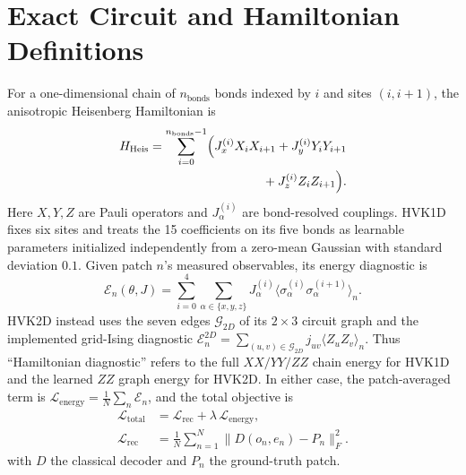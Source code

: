 \documentclass[11pt]{article}
\begin{document}
\section{Exact Circuit and Hamiltonian Definitions}
\label{sec:supp_exact_circuits}
For a one-dimensional chain of $n_{\text{bonds}}$ bonds indexed by $i$ and sites $(i,i+1)$, the anisotropic Heisenberg Hamiltonian is
\begin{align}
H_{\text{Heis}}=\sum_{i=0}^{n_{\text{bonds}}-1}\Bigl(
J_x^{(i)}X_iX_{i+1}+J_y^{(i)}Y_iY_{i+1}\nonumber\\
{}+J_z^{(i)}Z_iZ_{i+1}\Bigr).
\end{align}
Here $X,Y,Z$ are Pauli operators and $J_\alpha^{(i)}$ are bond-resolved couplings. HVK1D fixes six sites and treats the 15 coefficients on its five bonds as learnable parameters initialized independently from a zero-mean Gaussian with standard deviation $0.1$. Given patch $n$'s measured observables, its energy diagnostic is
\begin{equation}
\mathcal{E}_n(\theta,J) = \sum_{i=0}^{4}\sum_{\alpha\in\{x,y,z\}} J_\alpha^{(i)}\langle\sigma_\alpha^{(i)}\sigma_\alpha^{(i+1)}\rangle_n.
\end{equation}
HVK2D instead uses the seven edges $\mathcal{G}_{2D}$ of its $2\times3$ circuit graph and the implemented grid-Ising diagnostic $\mathcal{E}^{2D}_n=\sum_{(u,v)\in\mathcal{G}_{2D}}j_{uv}\langle Z_uZ_v\rangle_n$. Thus ``Hamiltonian diagnostic'' refers to the full $XX/YY/ZZ$ chain energy for HVK1D and the learned $ZZ$ graph energy for HVK2D. In either case, the patch-averaged term is $\mathcal{L}_{\text{energy}}=\frac{1}{N}\sum_n \mathcal{E}_n$, and the total objective is
\begin{align}
\mathcal{L}_{\text{total}}&=\mathcal{L}_{\text{rec}}
+\lambda\,\mathcal{L}_{\text{energy}},\\
\mathcal{L}_{\text{rec}}&=\frac{1}{N}\sum_{n=1}^{N}
\bigl\|D(o_n,e_n)-P_n\bigr\|_F^2.
\end{align}
with $D$ the classical decoder and $P_n$ the ground-truth patch.
\end{document}
